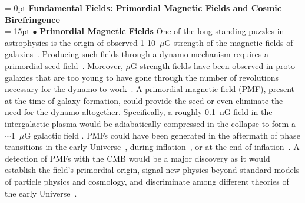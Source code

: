 \documentclass[PICOReport.tex]{subfiles}
\begin{document}
\vspace{0.1in}
\parindent = 0pt
{\bf Fundamental Fields: Primordial Magnetic Fields and Cosmic Birefringence} \\ %
\parindent = 15pt
$\bullet$ {\bf Primordial Magnetic Fields} \hspace{0.1in} One of the long-standing puzzles in astrophysics is the origin of observed 1-10~$\mu$G strength of the magnetic fields of galaxies~\cite{Widrow:2002ud}. Producing such fields through a dynamo mechanism requires a primordial seed field~\cite{Widrow:2011hs}. Moreover, $\mu$G-strength fields have been observed in proto-galaxies that are too young to have gone through the number of revolutions necessary for the dynamo to work~\cite{Athreya:1998}. A primordial magnetic field (PMF), present at the time of galaxy formation, could provide the seed or even eliminate the need for the dynamo altogether. Specifically,  a roughly 0.1~nG field in the intergalactic plasma would be adiabatically compressed in the collapse to form a $\sim$1~$\mu$G galactic field \cite{Grasso:2000wj}.
PMFs could have been generated in the aftermath of phase transitions in the early Universe~\cite{Vachaspati:1991nm}, during inflation~\cite{Turner:1987bw,Ratra:1991bn}, or at the end of inflation~\cite{DiazGil:2007dy}. A detection of PMFs with the CMB would be a major discovery as it would establish the field's primordial origin, signal new physics beyond standard models of particle physics and cosmology, and discriminate among different theories of the early Universe~\cite{Barnaby:2012tk,Long:2013tha,Durrer:2013pga}.
\end{document}
